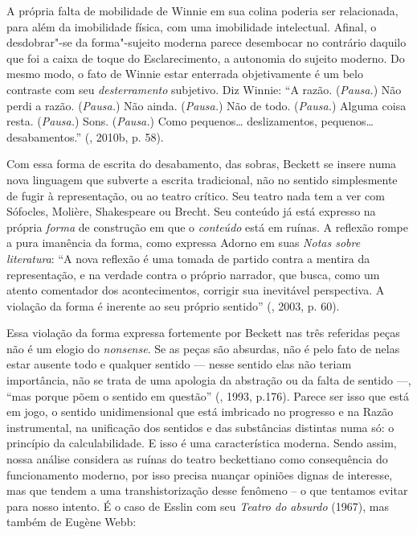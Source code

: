 {A própria falta de mobilidade de Winnie em sua colina poderia ser
relacionada, para além da imobilidade física, com uma imobilidade
intelectual. Afinal, o desdobrar"-se da forma"-sujeito moderna parece
desembocar no contrário daquilo que foi a caixa de toque do
Esclarecimento, a autonomia do sujeito moderno. Do mesmo modo, o fato de
Winnie estar enterrada objetivamente é um belo contraste com seu
\emph{desterramento} subjetivo. Diz Winnie: ``A razão. (\emph{Pausa.})
Não perdi a razão. (\emph{Pausa.}) Não ainda. (\emph{Pausa.}) Não de
todo. (\emph{Pausa.}) Alguma coisa resta. (\emph{Pausa.}) Sons.
(\emph{Pausa.}) Como pequenos\ldots{} deslizamentos, pequenos\ldots{}
desabamentos.'' (, 2010b, p. 58).

Com essa forma de escrita do desabamento, das sobras, Beckett se insere
numa nova linguagem que subverte a escrita tradicional, não no sentido
simplesmente de fugir à representação, ou ao teatro crítico. Seu teatro
nada tem a ver com Sófocles, Molière, Shakespeare ou Brecht. Seu
conteúdo já está expresso na própria \emph{forma} de construção em que o
\emph{conteúdo} está em ruínas. A reflexão rompe a pura imanência da
forma, como expressa Adorno em suas \emph{Notas sobre literatura}: ``A
nova reflexão é uma tomada de partido contra a mentira da representação,
e na verdade contra o próprio narrador, que busca, como um atento
comentador dos acontecimentos, corrigir sua inevitável perspectiva. A
violação da forma é inerente ao seu próprio sentido'' (, 2003, p.
60).

Essa violação da forma expressa fortemente por Beckett nas três
referidas peças não é um elogio do \emph{nonsense}. Se as peças são
absurdas, não é pelo fato de nelas estar ausente todo e qualquer sentido
--- nesse sentido elas não teriam importância, não se trata de uma
apologia da abstração ou da falta de sentido ---, ``mas porque põem o
sentido em questão'' (, 1993, p.176). Parece ser isso que está em
jogo, o sentido unidimensional que está imbricado no progresso e na
Razão instrumental, na unificação dos sentidos e das substâncias
distintas numa só: o princípio da calculabilidade. E isso é uma
característica moderna. Sendo assim, nossa análise considera as ruínas
do teatro beckettiano como consequência do funcionamento moderno, por
isso precisa nuançar opiniões dignas de interesse, mas que tendem a uma
transhistorização desse fenômeno -- o que tentamos evitar para nosso
intento. É o caso de Esslin com seu \emph{Teatro do absurdo} (1967), mas
também de Eugène Webb:

}
